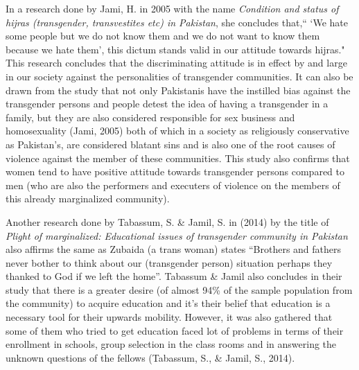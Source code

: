 In a research done by Jami, H. in 2005 with the name \textit {Condition and status of hijras (transgender, transvestites etc) in Pakistan}, she concludes that,“ `We hate some people but we do not know them and we do not want to know them because we hate them', this dictum stands valid in our attitude towards hijras." This research concludes that the discriminating attitude is in effect by and large in our society against the personalities of transgender communities. It can also be drawn from the study that not only Pakistanis have the instilled bias against the transgender persons and people detest the idea of having a transgender in a family, but they are also considered responsible for sex business and homosexuality (Jami, 2005) both of which in a society as religiously conservative as Pakistan's, are considered blatant sins and is also one of the root causes of violence against the member of these communities. This study also confirms that women tend to have positive attitude towards transgender persons compared to men (who are also the performers and executers of violence on the members of this already marginalized community). 

Another research done by Tabassum, S. \& Jamil, S. in (2014) by the title of \textit {Plight of marginalized: Educational issues of transgender community in Pakistan} also affirms the same as Zubaida (a trans woman) states “Brothers and fathers never bother to think about our (transgender person) situation perhaps they thanked to God if we left the home”. Tabassum \& Jamil also concludes in their study that there is a greater desire (of almost 94\% of the sample population from the community) to acquire education and it's their belief that education is a necessary tool for their upwards mobility. However, it was also gathered that some of them who tried to get education faced lot of problems in terms of their enrollment in schools, group selection in the class rooms and in answering the unknown questions of the fellows (Tabassum, S., \& Jamil, S., 2014). 

